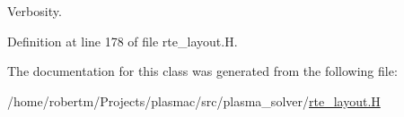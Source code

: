 Verbosity. 



Definition at line 178 of file rte\+\_\+layout.\+H.



The documentation for this class was generated from the following file\+:\begin{DoxyCompactItemize}
\item 
/home/robertm/\+Projects/plasmac/src/plasma\+\_\+solver/\hyperlink{rte__layout_8H}{rte\+\_\+layout.\+H}\end{DoxyCompactItemize}
